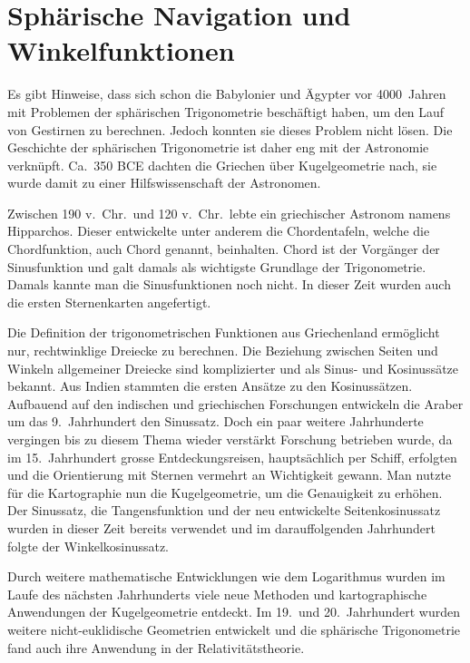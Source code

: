 


\section{Sphärische Navigation und Winkelfunktionen}
Es gibt Hinweise, dass sich schon die Babylonier und Ägypter vor
4000~Jahren mit Problemen der sphärischen Trigonometrie beschäftigt
haben, um den Lauf von Gestirnen zu berechnen.
%
%
Jedoch konnten sie dieses Problem nicht lösen. 
Die Geschichte der sphärischen Trigonometrie ist daher eng mit der Astronomie verknüpft.
%
Ca.~350 BCE dachten die Griechen über Kugelgeometrie nach, sie wurde damit zu einer Hilfswissenschaft der Astronomen.

Zwischen 190 v.~Chr.~und 120 v.~Chr.~lebte ein griechischer Astronom namens Hipparchos.
%
Dieser entwickelte unter anderem die Chordentafeln, welche die Chordfunktion,
auch Chord genannt, beinhalten.
%
Chord ist der Vorgänger der Sinusfunktion und galt damals als wichtigste
Grundlage der Trigonometrie.
Damals kannte man die Sinusfunktionen noch nicht.
In dieser Zeit wurden auch die ersten Sternenkarten angefertigt.

Die Definition der trigonometrischen Funktionen aus Griechenland
ermöglicht nur, rechtwinklige Dreiecke zu berechnen.
Die Beziehung zwischen Seiten und Winkeln allgemeiner Dreiecke
sind komplizierter und als Sinus- und Kosinussätze bekannt.
Aus Indien stammten die ersten Ansätze zu den Kosinussätzen.
%
Aufbauend auf den indischen und griechischen Forschungen entwickeln
die Araber um das 9.~Jahrhundert den Sinussatz. 
%
Doch ein paar weitere Jahrhunderte vergingen bis zu diesem Thema
wieder verstärkt Forschung betrieben wurde, da im 15.~Jahrhundert
grosse Entdeckungsreisen, hauptsächlich per Schiff, erfolgten und
die Orientierung mit Sternen vermehrt an Wichtigkeit gewann.
Man nutzte für die Kartographie nun die Kugelgeometrie, um die
Genauigkeit zu erhöhen.
Der Sinussatz, die Tangensfunktion und der neu entwickelte
Seitenkosinussatz wurden in dieser Zeit bereits verwendet und im
%
darauffolgenden Jahrhundert folgte der Winkelkosinussatz.
%

Durch weitere mathematische Entwicklungen wie dem Logarithmus wurden
im Laufe des nächsten Jahrhunderts viele neue Methoden und
kartographische Anwendungen der Kugelgeometrie entdeckt.
%
Im 19.~und 20.~Jahrhundert wurden weitere nicht-euklidische Geometrien
entwickelt und die sphärische Trigonometrie fand auch ihre Anwendung
in der Relativitätstheorie.

